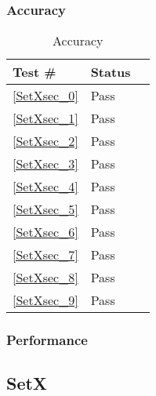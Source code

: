 \documentclass[12pt]{article}
\begin{document}
	\subsubsection{Accuracy}
		\begin{table}[H]
		\centering
		\caption{Accuracy}\label{GetY_acc}
		\begin{tabular}{lll}
		\toprule
		\bf Test \# & Status \\\midrule
		\ref{SetXsec_0} & Pass\\
		\ref{SetXsec_1} & Pass\\
		\ref{SetXsec_2} & Pass\\
		\ref{SetXsec_3} & Pass\\
		\ref{SetXsec_4} & Pass\\
		\ref{SetXsec_5} & Pass\\
		\ref{SetXsec_6} & Pass\\
		\ref{SetXsec_7} & Pass\\
		\ref{SetXsec_8} & Pass\\
		\ref{SetXsec_9} & Pass\\
		\bottomrule
		\end{tabular}
		\end{table}
	\subsubsection{Performance}

\subsection{SetX} %
\end{document}
